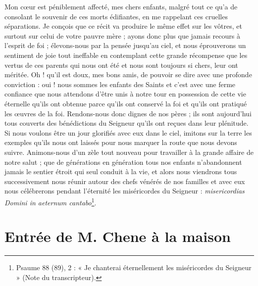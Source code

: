 \documentclass[11pt,a4paper]{report}
\begin{document}
Mon cœur est péniblement affecté, mes chers enfants, malgré tout ce qu'a de consolant le souvenir de ces morts édifiantes, en me rappelant ces cruelles séparations. Je conçois que ce récit va produire le même effet sur les vôtres, et surtout sur celui de votre pauvre mère ; ayons donc plus que jamais recours à l'esprit de foi ; élevons-nous par la pensée jusqu'au ciel, et nous éprouverons un sentiment de joie tout ineffable en contemplant cette grande récompense que les vertus de ces parents qui nous ont été et nous sont toujours si chers, leur ont méritée. Oh ! qu'il est doux, mes bons amis, de pouvoir se dire avec une profonde conviction : oui ! nous sommes les enfants des Saints et c'est avec une ferme confiance que nous attendons d'être unis à notre tour en possession de cette vie éternelle qu'ils ont obtenue parce qu'ils ont conservé la foi et qu'ils ont pratiqué les œuvres de la foi. Rendons-nous donc dignes de nos pères ; ils sont aujourd'hui tous couverts des bénédictions du Seigneur qu'ils ont reçues dans leur plénitude. Si nous voulons être un jour glorifiés avec eux dans le ciel, imitons sur la terre les exemples qu'ils nous ont laissés pour nous marquer la route que nous devons suivre. Animons-nous d'un zèle tout nouveau pour travailler à la grande affaire de notre salut ; que de générations en génération tous nos enfants n'abandonnent jamais le sentier étroit qui seul conduit à la vie, et alors nous viendrons tous successivement nous réunir autour des chefs vénérés de nos familles et avec eux nous célébrerons pendant l'éternité les miséricordes du Seigneur : \textit{misericordias Domini in aeternum cantabo}\footnote{Psaume 88 (89), 2 : « Je chanterai éternellement les miséricordes du Seigneur » (Note du transcripteur).}.

\section*{Entrée de M. Chene à la maison}
\end{document}

